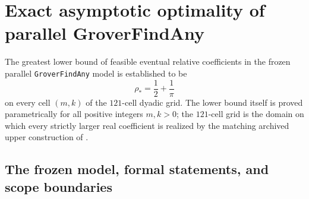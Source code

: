 \documentclass[11pt,a4paper]{article}
\theoremstyle{definition}
\theoremstyle{remark}
\begin{document}
\section{Exact asymptotic optimality of parallel GroverFindAny}
\label{sec:findany}

The greatest lower bound of feasible eventual relative coefficients in the frozen parallel \texttt{Grover\allowbreak FindAny} model is established to be
\[
  \rho_* = \frac{1}{2} + \frac{1}{\pi}
\]
on every cell \((m,k)\) of the \(121\)-cell dyadic grid. The lower bound itself is proved parametrically for all positive integers \(m, k > 0\); the \(121\)-cell grid is the domain on which every strictly larger real coefficient is realized by the matching archived upper construction of \cite{shirobokov2026}.

\subsection{The frozen model, formal statements, and scope boundaries}
\label{sec:findany-model}
\end{document}

